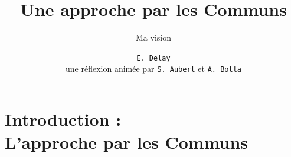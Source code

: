 \documentclass[newPxFont]{beamer}
\title{Une approche par les Communs}
\subtitle{Ma vision}
\author{\texttt{E. Delay}\\
 une réflexion animée par \texttt{S. Aubert} et \texttt{A. Botta}}
\institute{CIRAD -- UMR SENS}
\begin{document}
%
%


\maketitle


%
%


\section{Introduction :\\ L'approche par les Communs}
\end{document}
